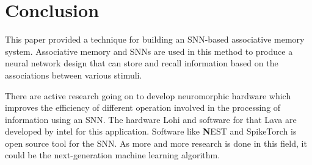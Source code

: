 \chapter{Conclusion}%

This paper provided a technique for building an SNN-based associative memory
system. Associative memory and SNNs are used in this method to produce a neural
network design that can store and recall information based on the associations between various stimuli.

There are active research going on to develop neuromorphic hardware which
improves the efficiency of different operation involved in the processing of
information using an SNN. The hardware Lohi\cite{lohi} and software for that
Lava\cite{lava} are developed by intel for this application. Software like
\textbf NEST\cite{nest} and SpikeTorch\cite{spiketorch} is open source tool for
the SNN. As more and more research is done in this field, it could be the
next-generation machine learning algorithm.